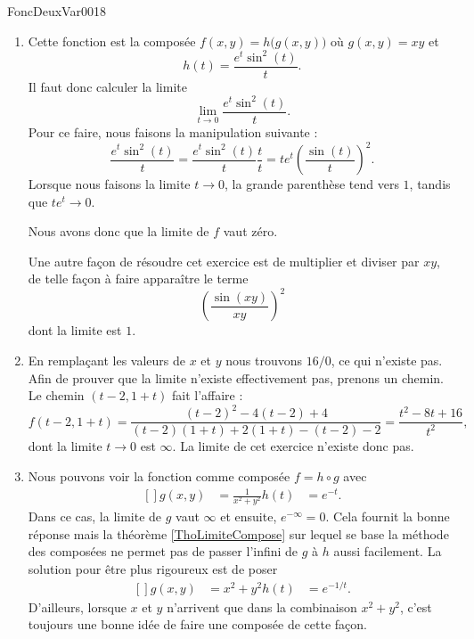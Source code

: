 \begin{corrige}{FoncDeuxVar0018}
\begin{enumerate}
		\item	%
			Cette fonction est la composée $f(x,y)=h\big( g(x,y) \big)$ où $g(x,y)=xy$ et
			\begin{equation}
				h(t)=\frac{  e^{t}\sin^2(t) }{ t }.
			\end{equation}
			Il faut donc calculer la limite
			\begin{equation}
				\lim_{t\to 0}\frac{  e^{t}\sin^2(t) }{ t }.
			\end{equation}
			Pour ce faire, nous faisons la manipulation suivante :
			\begin{equation}
				\frac{  e^{t}\sin^2(t) }{ t }=\frac{  e^{t}\sin^2(t) }{ t }\frac{ t }{ t }=t e^{t}\left( \frac{ \sin(t) }{ t } \right)^2.
			\end{equation}
			Lorsque nous faisons la limite $t\to 0$, la grande parenthèse tend vers $1$, tandis que $t e^{t}\to 0$.

			Nous avons donc que la limite de $f$ vaut zéro.

			Une autre façon de résoudre cet exercice est de multiplier et diviser par $xy$, de telle façon à faire apparaître le terme
			\begin{equation}
				\left( \frac{ \sin(xy) }{ xy } \right)^2
			\end{equation}
			dont la limite est $1$.
		\item	%
			En remplaçant les valeurs de $x$ et $y$ nous trouvons $16/0$, ce qui n'existe pas. Afin de prouver que la limite n'existe effectivement pas, prenons un chemin. Le chemin $(t-2,1+t)$ fait l'affaire :
			\begin{equation}
				f(t-2,1+t)=\frac{ (t-2)^2-4(t-2)+4 }{ (t-2)(1+t)+2(1+t)-(t-2)-2 }=\frac{ t^2-8t+16 }{ t^2 },
			\end{equation}
			dont la limite $t\to 0$ est $\infty$. La limite de cet exercice n'existe donc pas.
		\item	%
			Nous pouvons voir la fonction comme composée $f=h\circ g$ avec
			\begin{equation}
				\begin{aligned}[]
					g(x,y)&=\frac{1}{ x^2+y^2 }
					h(t)&= e^{-t}.
				\end{aligned}
			\end{equation}
			Dans ce cas, la limite de $g$ vaut $\infty$ et ensuite, $ e^{-\infty}=0$. Cela fournit la bonne réponse mais la théorème \ref{ThoLimiteCompose} sur lequel se base la méthode des composées ne permet pas de passer l'infini de $g$ à $h$ aussi facilement. La solution pour être plus rigoureux est de poser
			\begin{equation}
				\begin{aligned}[]
					g(x,y)&=x^2+y^2
					h(t)&= e^{-1/t}.
				\end{aligned}
			\end{equation}
			D'ailleurs, lorsque $x$ et $y$ n'arrivent que dans la combinaison $x^2+y^2$, c'est toujours une bonne idée de faire une composée de cette façon.


\end{enumerate}
\end{corrige}
